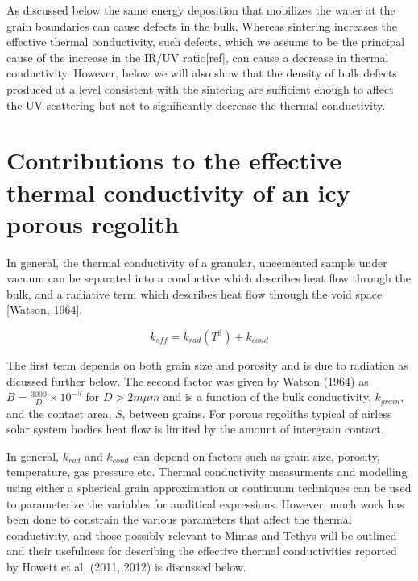 \documentclass[11pt]{article} %
\begin{document}
\begin{itemize}
	 As discussed below the same energy deposition that mobilizes the water at the grain boundaries can cause defects in the bulk. Whereas sintering increases the effective thermal conductivity, such defects, which we assume to be the principal cause of the increase in the IR/UV ratio[ref], can cause a decrease in thermal conductivity. However, below we will also show that the density of bulk defects produced at a level consistent with the sintering are sufficient enough to affect the UV scattering but not to significantly decrease the thermal conductivity.
	
	
\section{Contributions to the effective thermal conductivity of an icy porous regolith}

	In general, the thermal conductivity of a granular, uncemented sample under vacuum can be separated into a conductive which describes heat flow through the bulk, and a radiative term which describes heat flow through the void space [Watson, 1964]. 
	
	\begin{equation} \label{eq:TCbasic}
	k_{eff} = k_{rad}(T^{3}) + k_{cond}
	\end{equation} 
	
	The first term depends on both grain size and porosity and is due to radiation as dicussed further below. The second factor was given by Watson (1964) as $B = \frac{3000}{D}\times10^{-5}$ for $D > 2m \mu m$ and is a function of the bulk conductivity, $k_{grain}$, and the contact area, $S$, between grains. For porous regoliths typical of airless solar system bodies heat flow is limited by the  amount of intergrain contact.

	In general, $k_{rad}$ and $k_{cond}$ can depend on factors such as grain size, porosity, temperature, gas pressure etc. Thermal conductivity measurments and modelling using either a spherical grain approximation or continuum techniques can be used to parameterize the variables for analitical expressions. However, much work has been done to constrain the various parameters that affect the thermal conductivity, and those possibly relevant to Mimas and Tethys will be outlined and their usefulness for describing the effective thermal conductivities reported by Howett et al, (2011, 2012) is discussed below.
	

\end{itemize}
\end{document}
